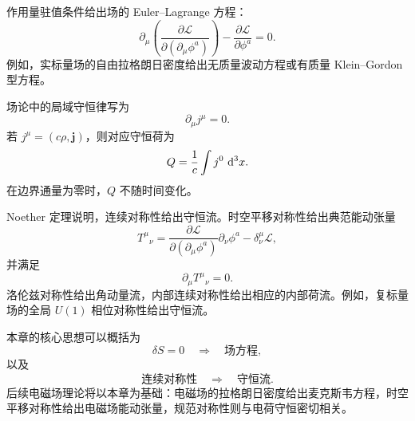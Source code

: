 作用量驻值条件给出场的 Euler--Lagrange 方程：
\[
\partial_{\mu}\left(
\frac{\partial\mathcal{L}}{\partial(\partial_{\mu}\phi^{a})}
\right)
-
\frac{\partial\mathcal{L}}{\partial\phi^{a}}
=0.
\]
例如，实标量场的自由拉格朗日密度给出无质量波动方程或有质量 Klein--Gordon 型方程。

场论中的局域守恒律写为
\[
\partial_{\mu}j^{\mu}=0.
\]
若 $j^{\mu}=(c\rho,\bm{j})$，则对应守恒荷为
\[
Q=\frac{1}{c}\int j^{0}\,\mathop{}\!\mathrm{d}^{3}x.
\]
在边界通量为零时，$Q$ 不随时间变化。

Noether 定理说明，连续对称性给出守恒流。时空平移对称性给出典范能动张量
\[
T^{\mu}{}_{\nu}
=
\frac{\partial\mathcal{L}}{\partial(\partial_{\mu}\phi^{a})}
\partial_{\nu}\phi^{a}
-
\delta^{\mu}_{\nu}\mathcal{L},
\]
并满足
\[
\partial_{\mu}T^{\mu}{}_{\nu}=0.
\]
洛伦兹对称性给出角动量流，内部连续对称性给出相应的内部荷流。例如，复标量场的全局 $U(1)$ 相位对称性给出守恒流。

本章的核心思想可以概括为
\[
\delta S=0
\quad\Longrightarrow\quad
\text{场方程},
\]
以及
\[
\text{连续对称性}
\quad\Longrightarrow\quad
\text{守恒流}.
\]
后续电磁场理论将以本章为基础：电磁场的拉格朗日密度给出麦克斯韦方程，时空平移对称性给出电磁场能动张量，规范对称性则与电荷守恒密切相关。
